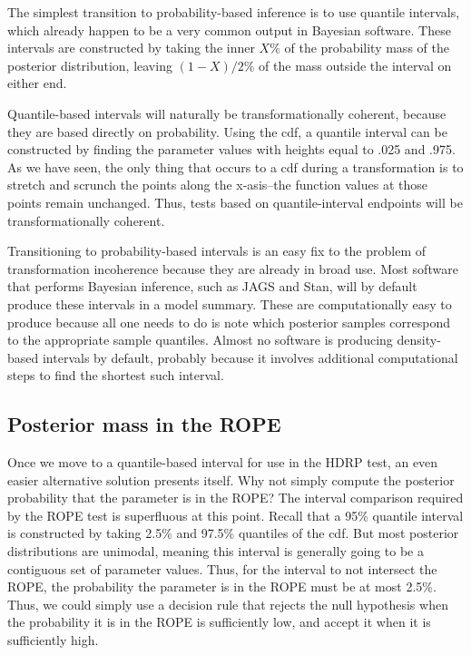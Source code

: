 \documentclass[man]{apa}
\newcommand{\hdr}{HDRP}
\begin{document}
The simplest transition to probability-based inference is to use quantile intervals, which already happen to be a very common output in Bayesian software. 
These intervals are constructed by taking the inner $X\%$ of the probability mass of the posterior distribution, leaving $(1-X)/2\%$ of the mass outside the interval on either end. 

Quantile-based intervals will naturally be transformationally coherent, because they are based directly on probability. Using the cdf, a quantile interval can be constructed by finding the parameter values with heights equal to .025 and .975. As we have seen, the only thing that occurs to a cdf during a transformation is to stretch and scrunch the points along the x-asis--the function values at those points remain unchanged. Thus, tests based on quantile-interval endpoints will be transformationally coherent.

Transitioning to probability-based intervals is an easy fix to the problem of transformation incoherence because they are already in broad use. Most software that performs Bayesian inference, such as JAGS and Stan, will by default produce these intervals in a model summary. These are computationally easy to produce because all one needs to do is note which posterior samples correspond to the appropriate sample quantiles. Almost no software is producing density-based intervals by default, probably because it involves additional computational steps to find the shortest such interval.


\subsection*{Posterior mass in the ROPE}

Once we move to a quantile-based interval for use in the \hdr{} test, an even easier alternative solution presents itself. Why not simply compute the posterior probability that the parameter is in the ROPE? The interval comparison required by the ROPE test is superfluous at this point. Recall that a 95\% quantile interval is constructed by taking 2.5\% and 97.5\% quantiles of the cdf. But most posterior distributions are unimodal, meaning this interval is generally going to be a contiguous set of parameter values. Thus, for the interval to not intersect the ROPE, the probability the parameter is in the ROPE must be at most 2.5\%. Thus, we could simply use a decision rule that rejects the null hypothesis when the probability it is in the ROPE is sufficiently low, and accept it when it is sufficiently high. 
\end{document}
